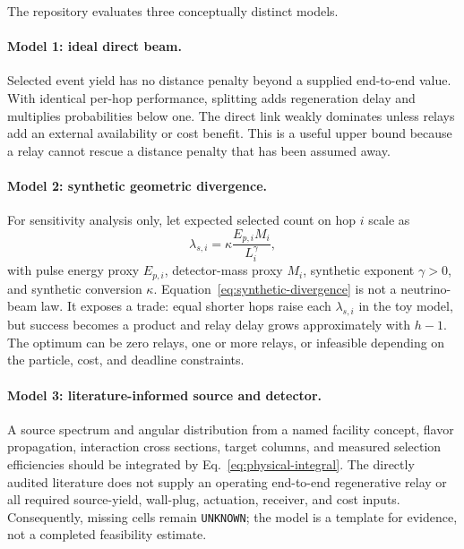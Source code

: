 \documentclass[11pt]{article}
\newcommand{\unknown}{\texttt{UNKNOWN}}
\begin{document}
The repository evaluates three conceptually distinct models.

\paragraph{Model 1: ideal direct beam.} Selected event yield has no distance penalty beyond a supplied end-to-end value. With identical per-hop performance, splitting adds regeneration delay and multiplies probabilities below one. The direct link weakly dominates unless relays add an external availability or cost benefit. This is a useful upper bound because a relay cannot rescue a distance penalty that has been assumed away.

\paragraph{Model 2: synthetic geometric divergence.} For sensitivity analysis only, let expected selected count on hop $i$ scale as
\begin{equation}
\lambda_{s,i}=\kappa\frac{E_{p,i}M_i}{L_i^{\gamma}},
\label{eq:synthetic-divergence}
\end{equation}
with pulse energy proxy $E_{p,i}$, detector-mass proxy $M_i$, synthetic exponent $\gamma>0$, and synthetic conversion $\kappa$. Equation~\eqref{eq:synthetic-divergence} is not a neutrino-beam law. It exposes a trade: equal shorter hops raise each $\lambda_{s,i}$ in the toy model, but success becomes a product and relay delay grows approximately with $h-1$. The optimum can be zero relays, one or more relays, or infeasible depending on the particle, cost, and deadline constraints.

\paragraph{Model 3: literature-informed source and detector.} A source spectrum and angular distribution from a named facility concept, flavor propagation, interaction cross sections, target columns, and measured selection efficiencies should be integrated by Eq.~\eqref{eq:physical-integral}. The directly audited literature does not supply an operating end-to-end regenerative relay or all required source-yield, wall-plug, actuation, receiver, and cost inputs. Consequently, missing cells remain \unknown; the model is a template for evidence, not a completed feasibility estimate.
\end{document}
